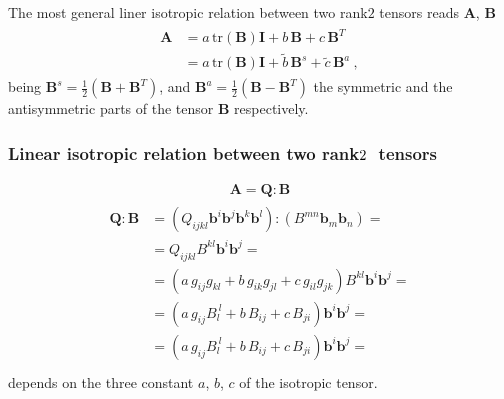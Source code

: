 \documentclass[letterpaper,10pt,english]{jupyterBook}
\begin{document}
\sphinxAtStartPar
The most general liner isotropic relation between two rank\sphinxhyphen{}\(2\) tensors reads \(\mathbf{A}\), \(\mathbf{B}\)
\begin{equation*}
\begin{split}\begin{aligned}
  \mathbf{A} 
  & = a \, \text{tr}\left( \mathbf{B} \right) \mathbf{I} + b \, \mathbf{B} + c \, \mathbf{B}^T \\
  & = a \, \text{tr}\left( \mathbf{B} \right) \mathbf{I} + \widetilde{b} \, \mathbf{B}^s + \widetilde{c} \, \mathbf{B}^a \ ,
\end{aligned}\end{split}
\end{equation*}
\sphinxAtStartPar
being \(\mathbf{B}^s = \frac{1}{2} \left( \mathbf{B} + \mathbf{B}^T \right)\), and \(\mathbf{B}^a = \frac{1}{2} \left( \mathbf{B} - \mathbf{B}^T \right)\) the symmetric and the anti\sphinxhyphen{}symmetric parts of the tensor \(\mathbf{B}\) respectively.
\subsubsection*{Linear isotropic relation between two rank\sphinxhyphen{}\protect\(2 \ \protect\) tensors}
\begin{equation*}
\begin{split}\mathbf{A} = \mathbf{Q} : \mathbf{B}\end{split}
\end{equation*}\begin{equation*}
\begin{split}\begin{aligned}
  \mathbf{Q} : \mathbf{B} 
  & = \left( Q_{ijkl} \mathbf{b}^i \mathbf{b}^j \mathbf{b}^k \mathbf{b}^l \right) : \left( B^{mn} \mathbf{b}_m \mathbf{b}_n  \right) = \\
  & = Q_{ijkl} B^{kl} \mathbf{b}^i \mathbf{b}^j = \\
  & = \left( a \, g_{ij} g_{kl}    + b \, g_{ik} g_{jl} + c \, g_{il} g_{jk} \right) B^{kl} \mathbf{b}^i \mathbf{b}^j = \\
  & = \left( a \, g_{ij} B_l^{\ l} + b \, B_{ij}        + c \, B_{ji} \right) \mathbf{b}^i \mathbf{b}^j = \\ 
  & = \left( a \, g_{ij} B_l^{\ l} + b \, B_{ij}        + c \, B_{ji} \right) \mathbf{b}^i \mathbf{b}^j = \\ 
\end{aligned}\end{split}
\end{equation*}
\sphinxAtStartPar
depends on the three constant \(a\), \(b\), \(c\) of the isotropic tensor.
\end{document}
